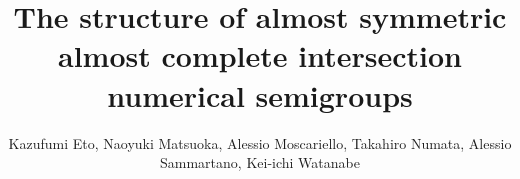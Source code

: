 \documentclass[11pt,twoside]{amsart}
\theoremstyle{definition}
\numberwithin{equation}{section}
\begin{document}
\title[
Almost symmetric almost complete intersection numerical semigroups
]{
The structure of almost symmetric almost complete intersection numerical semigroups} 

\author[Kazufumi Eto et al.]{Kazufumi Eto,
Naoyuki Matsuoka,
Alessio Moscariello,
Takahiro Numata,
Alessio Sammartano,
Kei-ichi Watanabe
}

\address[Kazufumi Eto]{Department of Mathematics, Nippon Institute of Technology, 
Miyashiro, Saitama, Japan 345-8501}
\address[Alessio Moscariello]{
Department of Mathematics and Scientific Computing, University of Graz, NAWI Graz,
Heinrichstra{\ss}e 36,
8010 Graz}

\address[Naoyuki Matsuoka]{Department of Mathematics, School of Science and Technology, Meiji University,
1-1-1 Higashi-mita, Tama-ku, Kawasaki, Japan 214-8571
}

\address[Takahiro Numata]{School of Science and Technology, Meiji University,
1-1-1 Higashi-mita, Tama-ku, Kawasaki, Japan 214-8571
}

\address[Alessio Sammartano]{Dipartimento di Matematica,
Politecnico di Milano,
Milano, 20133, Italy}

\address[Kei-ichi Watanabe]{Department of Mathematics, College of Humanities and Sciences, 
Nihon University, Setagaya-ku, Tokyo, 156-8550, Japan and 
Organization for the Strategic Coordination of Research and Intellectual Properties, Meiji University
}





\end{document}

